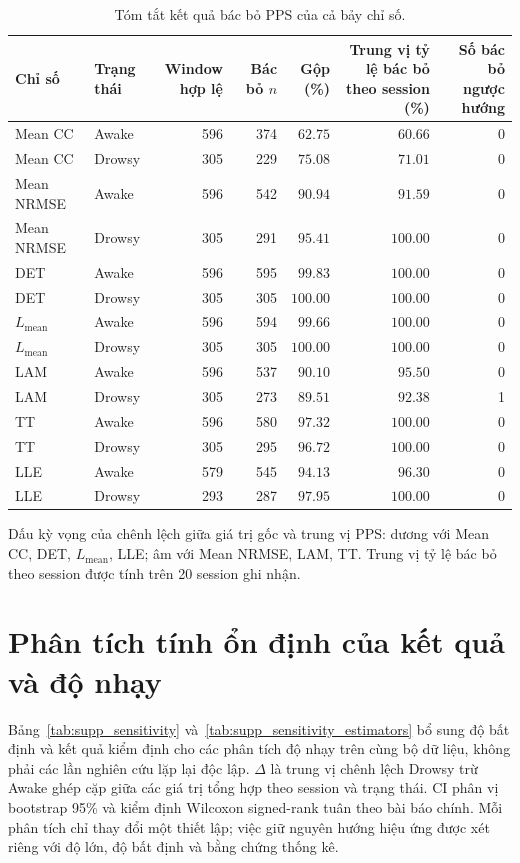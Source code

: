 \documentclass[conference,a4paper]{IEEEtran}
\begin{document}
\begin{table}[t]
\centering
\caption{Tóm tắt kết quả bác bỏ PPS của cả bảy chỉ số.}\label{tab:supp_pps}
\footnotesize
\setlength{\tabcolsep}{3pt}
\renewcommand{\arraystretch}{1.05}
\begin{tabular*}{\linewidth}{@{\extracolsep{\fill}}llrrrrr@{}}
\toprule
Chỉ số & Trạng thái & \makecell{Window\\hợp lệ} & \makecell{Bác bỏ\\$n$} & \makecell{Gộp\\(\%)} & \makecell{Trung vị tỷ lệ bác bỏ\\theo session (\%)} & \makecell{Số bác bỏ\\ngược hướng}\\
\midrule
Mean CC & Awake & 596 & 374 & $62.75$ & $60.66$ & 0\\
Mean CC & Drowsy & 305 & 229 & $75.08$ & $71.01$ & 0\\
Mean NRMSE & Awake & 596 & 542 & $90.94$ & $91.59$ & 0\\
Mean NRMSE & Drowsy & 305 & 291 & $95.41$ & $100.00$ & 0\\
DET & Awake & 596 & 595 & $99.83$ & $100.00$ & 0\\
DET & Drowsy & 305 & 305 & $100.00$ & $100.00$ & 0\\
$L_{\mathrm{mean}}$ & Awake & 596 & 594 & $99.66$ & $100.00$ & 0\\
$L_{\mathrm{mean}}$ & Drowsy & 305 & 305 & $100.00$ & $100.00$ & 0\\
LAM & Awake & 596 & 537 & $90.10$ & $95.50$ & 0\\
LAM & Drowsy & 305 & 273 & $89.51$ & $92.38$ & 1\\
TT & Awake & 596 & 580 & $97.32$ & $100.00$ & 0\\
TT & Drowsy & 305 & 295 & $96.72$ & $100.00$ & 0\\
LLE & Awake & 579 & 545 & $94.13$ & $96.30$ & 0\\
LLE & Drowsy & 293 & 287 & $97.95$ & $100.00$ & 0\\
\bottomrule
\end{tabular*}
\par\smallskip
\raggedright Dấu kỳ vọng của chênh lệch giữa giá trị gốc và trung vị PPS: dương với Mean CC, DET, $L_{\mathrm{mean}}$, LLE; âm với Mean NRMSE, LAM, TT. Trung vị tỷ lệ bác bỏ theo session được tính trên 20 session ghi nhận.
\end{table}
\section{Phân tích tính ổn định của kết quả và độ nhạy}\label{sec:supp_6}
Bảng~\ref{tab:supp_sensitivity} và~\ref{tab:supp_sensitivity_estimators} bổ sung độ bất định và kết quả kiểm định cho các phân tích độ nhạy trên cùng bộ dữ liệu, không phải các lần nghiên cứu lặp lại độc lập. $\Delta$ là trung vị chênh lệch Drowsy trừ Awake ghép cặp giữa các giá trị tổng hợp theo session và trạng thái. CI phân vị bootstrap 95\% và kiểm định Wilcoxon signed-rank tuân theo bài báo chính. Mỗi phân tích chỉ thay đổi một thiết lập; việc giữ nguyên hướng hiệu ứng được xét riêng với độ lớn, độ bất định và bằng chứng thống kê.
\end{document}
